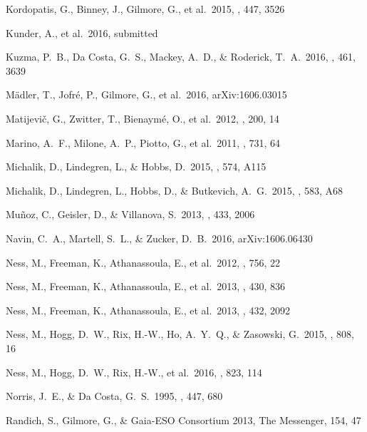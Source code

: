 \documentclass[preprint,trackchanges]{aastex}
\begin{document}
\begin{thebibliography}{dummy}
 Kordopatis, G., Binney, J., Gilmore, G., et al.\ 2015, \mnras, 447, 3526 

 Kunder, A., et al.\ 2016, submitted

 Kuzma, P.~B., Da Costa, G.~S., Mackey, A.~D., \& Roderick, T.~A.\ 2016, \mnras, 461, 3639 

 M{\"a}dler, T., Jofr{\'e}, P., Gilmore, G., et al.\ 2016, arXiv:1606.03015 

 Matijevi{\v c}, G., Zwitter, T., Bienaym{\'e}, O., et al.\ 2012, \apjs, 200, 14 

 Marino, A.~F., Milone, A.~P., Piotto, G., et al.\ 2011, \apj, 731, 64 

 Michalik, D., Lindegren, L., \& Hobbs, D.\ 2015, \aap, 574, A115 

 Michalik, D., Lindegren, L., Hobbs, D., \& Butkevich, A.~G.\ 2015, \aap, 583, A68 

 Mu{\~n}oz, C., Geisler, D., \& Villanova, S.\ 2013, \mnras, 433, 2006 

 Navin, C.~A., Martell, S.~L., \& Zucker, D.~B.\ 2016, arXiv:1606.06430 

 Ness, M., Freeman, K., Athanassoula, E., et al.\ 2012, \apj, 756, 22 

 Ness, M., Freeman, K., Athanassoula, E., et al.\ 2013, \mnras, 430, 836 

 Ness, M., Freeman, K., Athanassoula, E., et al.\ 2013, \mnras, 432, 2092 

 Ness, M., Hogg, D.~W., Rix, H.-W., Ho, A.~Y.~Q., \& Zasowski, G.\ 2015, \apj, 808, 16 

 Ness, M., Hogg, D.~W., Rix, H.-W., et al.\ 2016, \apj, 823, 114 

 Norris, J.~E., \& Da Costa, G.~S.\ 1995, \apj, 447, 680 

 Randich, S., Gilmore, G., \& Gaia-ESO Consortium 2013, The Messenger, 154, 47 


\end{thebibliography}
\end{document}
